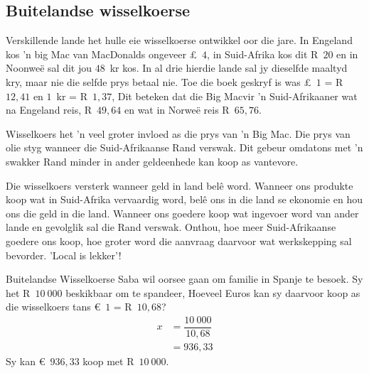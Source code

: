\subsection{Buitelandse wisselkoerse}

Verskillende lande het hulle eie wisselkoerse ontwikkel oor die jare. In Engeland kos 'n big Mac van MacDonalds ongeveer £~$4$, in Suid-Afrika kos dit R~$20$ en in Noonwe\"e sal dit jou $48$~kr kos. In al drie hierdie lande sal jy dieselfde maaltyd kry, maar nie die selfde prys betaal nie. Toe die boek geskryf is was £~$1$ = R~$12,41$ en $1$~kr = R~$1,37$, Dit beteken dat die Big Macvir 'n Suid-Afrikaaner wat na Engeland reis, R~$49,64$ en wat in Norwe\"e reis R~$65,76$.\par

Wisselkoers het 'n veel groter invloed as die prys van 'n Big Mac. Die prys van olie styg wanneer die Suid-Afrikaanse Rand verswak. Dit gebeur omdatons met 'n swakker Rand minder in ander geldeenhede kan koop as vantevore.\par

Die wisselkoers versterk wanneer geld in land bel\^e word. Wanneer ons produkte koop wat in Suid-Afrika vervaardig word, bel\^e ons in die land se ekonomie en hou ons die geld in die land. Wanneer ons goedere koop wat ingevoer word van ander lande en gevolglik sal die Rand verswak. Onthou, hoe meer Suid-Afrikaanse goedere ons koop, hoe groter word die aanvraag daarvoor wat werkskepping sal bevorder. 'Local is lekker'!
\par
{}

\begin{wex}{Buitelandse Wisselkoerse}
    {Saba wil oorsee gaan om familie in Spanje te besoek. Sy het R~$10~000$ beskikbaar om te spandeer, Hoeveel Euros kan sy daarvoor koop as die wisselkoers tans €~$1$ = R~$10,68$?}
{
\begin{align*}
 x &= \dfrac{10~000}{10,68}\\
&= 936,33
\end{align*}  
Sy kan €~$936,33$ koop met R~$10~000$.
}
\end{wex}


